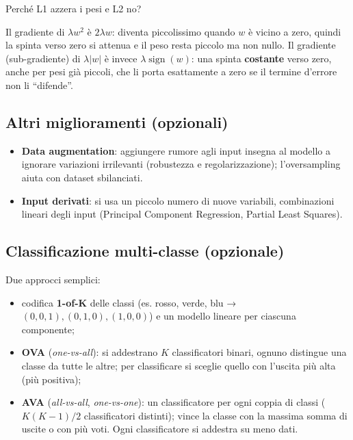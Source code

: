 \begin{boxtip}{Perché L1 azzera i pesi e L2 no?}

Il gradiente di \(\lambda w^2\) è \(2\lambda w\): diventa piccolissimo
quando \(w\) è vicino a zero, quindi la spinta verso zero si attenua e
il peso resta piccolo ma non nullo. Il gradiente (sub-gradiente) di
\(\lambda|w|\) è invece \(\lambda\operatorname{sign}(w)\): una spinta
\textbf{costante} verso zero, anche per pesi già piccoli, che li porta
esattamente a zero se il termine d'errore non li ``difende''.

\end{boxtip}

\subsection{Altri miglioramenti
(opzionali)}\label{altri-miglioramenti-opzionali}

\begin{itemize}
\tightlist
\item
  \textbf{Data augmentation}: aggiungere rumore agli input insegna al
  modello a ignorare variazioni irrilevanti (robustezza e
  regolarizzazione); l'oversampling aiuta con dataset sbilanciati.
\item
  \textbf{Input derivati}: si usa un piccolo numero di nuove variabili,
  combinazioni lineari degli input (Principal Component Regression,
  Partial Least Squares).
\end{itemize}

\subsection{Classificazione multi-classe
(opzionale)}\label{classificazione-multi-classe-opzionale}

Due approcci semplici:

\begin{itemize}
\tightlist
\item
  codifica \textbf{1-of-K} delle classi (es. rosso, verde, blu →
  \((0,0,1), (0,1,0), (1,0,0)\)) e un modello lineare per ciascuna
  componente;
\item
  \textbf{OVA} (\emph{one-vs-all}): si addestrano \(K\) classificatori
  binari, ognuno distingue una classe da tutte le altre; per
  classificare si sceglie quello con l'uscita più alta (più positiva);
\item
  \textbf{AVA} (\emph{all-vs-all}, \emph{one-vs-one}): un classificatore
  per ogni coppia di classi (\(K(K-1)/2\) classificatori distinti);
  vince la classe con la massima somma di uscite o con più voti. Ogni
  classificatore si addestra su meno dati.
\end{itemize}

